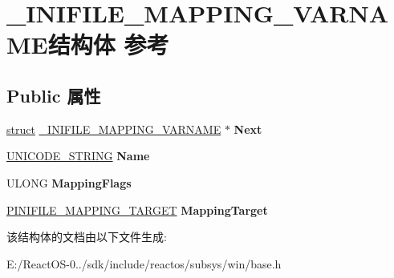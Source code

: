 \hypertarget{struct___i_n_i_f_i_l_e___m_a_p_p_i_n_g___v_a_r_n_a_m_e}{}\section{\+\_\+\+I\+N\+I\+F\+I\+L\+E\+\_\+\+M\+A\+P\+P\+I\+N\+G\+\_\+\+V\+A\+R\+N\+A\+M\+E结构体 参考}
\label{struct___i_n_i_f_i_l_e___m_a_p_p_i_n_g___v_a_r_n_a_m_e}
\subsection*{Public 属性}
\begin{DoxyCompactItemize}
\item 
\mbox{\label{struct___i_n_i_f_i_l_e___m_a_p_p_i_n_g___v_a_r_n_a_m_e_a7d6d8f85e1568e3da938a39c7b90ba8d}} 
\hyperlink{interfacestruct}{struct} \hyperlink{struct___i_n_i_f_i_l_e___m_a_p_p_i_n_g___v_a_r_n_a_m_e}{\+\_\+\+I\+N\+I\+F\+I\+L\+E\+\_\+\+M\+A\+P\+P\+I\+N\+G\+\_\+\+V\+A\+R\+N\+A\+ME} $\ast$ {\bfseries Next}
\item 
\mbox{\label{struct___i_n_i_f_i_l_e___m_a_p_p_i_n_g___v_a_r_n_a_m_e_a45877823c61d1236dfe927af3c7f70e0}} 
\hyperlink{struct___u_n_i_c_o_d_e___s_t_r_i_n_g}{U\+N\+I\+C\+O\+D\+E\+\_\+\+S\+T\+R\+I\+NG} {\bfseries Name}
\item 
\mbox{\label{struct___i_n_i_f_i_l_e___m_a_p_p_i_n_g___v_a_r_n_a_m_e_a3566fa6745e3c2168e0fe1ebee202749}} 
U\+L\+O\+NG {\bfseries Mapping\+Flags}
\item 
\mbox{\label{struct___i_n_i_f_i_l_e___m_a_p_p_i_n_g___v_a_r_n_a_m_e_a7c5b5e5f5b1ec282a33569f46a85fc75}} 
\hyperlink{struct___i_n_i_f_i_l_e___m_a_p_p_i_n_g___t_a_r_g_e_t}{P\+I\+N\+I\+F\+I\+L\+E\+\_\+\+M\+A\+P\+P\+I\+N\+G\+\_\+\+T\+A\+R\+G\+ET} {\bfseries Mapping\+Target}
\end{DoxyCompactItemize}


该结构体的文档由以下文件生成\+:\begin{DoxyCompactItemize}
\item 
E\+:/\+React\+O\+S-\/0../sdk/include/reactos/subsys/win/base.\+h\end{DoxyCompactItemize}
